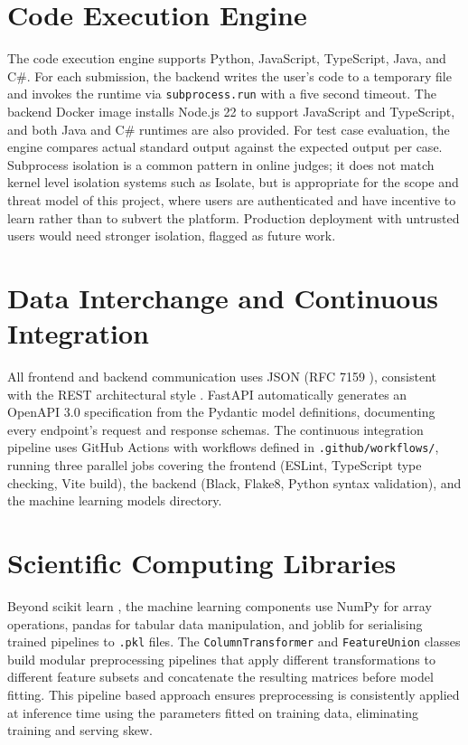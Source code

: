 \section{Code Execution Engine}

The code execution engine supports Python, JavaScript, TypeScript,
Java, and C\#. For each submission, the backend writes the user's
code to a temporary file and invokes the runtime via
\texttt{subprocess.run} with a five second timeout. The backend Docker
image installs Node.js 22 to support JavaScript and TypeScript, and
both Java and C\# runtimes are also provided. For test case
evaluation, the engine compares actual standard output against the
expected output per case. Subprocess isolation is a common pattern in
online judges; it does not match kernel level isolation systems such
as Isolate, but is appropriate for the scope and threat model of this
project, where users are authenticated and have incentive to learn
rather than to subvert the platform. Production deployment with
untrusted users would need stronger isolation, flagged as future work.

\section{Data Interchange and Continuous Integration}

All frontend and backend communication uses JSON (RFC 7159
\cite{json2014}), consistent with the REST architectural style
\cite{fielding2000rest}. FastAPI automatically generates an OpenAPI
3.0 specification \cite{openapi2025} from the Pydantic model
definitions, documenting every endpoint's request and response
schemas. The continuous integration pipeline uses GitHub Actions
\cite{githubactions2025} with workflows defined in
\texttt{.github/workflows/}, running three parallel jobs covering the
frontend (ESLint, TypeScript type checking, Vite build), the backend
(Black, Flake8, Python syntax validation), and the machine learning
models directory.

\section{Scientific Computing Libraries}

Beyond scikit learn \cite{pedregosa2011,buitinck2013api}, the machine
learning components use NumPy \cite{numpy2020} for array operations,
pandas \cite{mckinney2010pandas} for tabular data manipulation, and
joblib \cite{joblib2025} for serialising trained pipelines to
\texttt{.pkl} files. The \texttt{ColumnTransformer} and
\texttt{FeatureUnion} classes build modular preprocessing pipelines
that apply different transformations to different feature subsets and
concatenate the resulting matrices before model fitting. This pipeline
based approach ensures preprocessing is consistently applied at
inference time using the parameters fitted on training data,
eliminating training and serving skew. 

